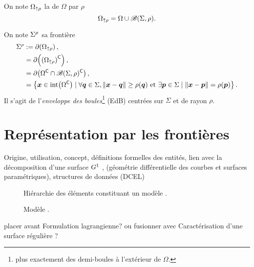 On note ${\Omega}_{\uparrow \rho}$ la  de $\Omega$ par $\rho$
\begin{equation}
    {\Omega}_{\uparrow \rho} = \Omega \cup \mathscr{B}(\Sigma,\rho).
\end{equation}

On note ${\Sigma}^{\rho}$ sa frontière
\begin{align}
    {\Sigma}^{\rho} 
    &:= \partial  \!\left({\Omega}_{\uparrow \rho}\right), \\
    &=  \partial  \!\left(\left({\Omega}_{\uparrow \rho}\right) ^\mathsf{C}\right) , \nonumber\\
    &=  \partial  \!\left(\Omega^\mathsf{C} \cap \mathscr{B}(\Sigma,\rho)^\mathsf{C}\right),\nonumber\\
    &= 
    \left\{
        \boldsymbol{x} \in \mathrm{int}{ \left(\Omega ^\mathsf{C}\right) }
        \mid \forall \boldsymbol{q} \in \Sigma, \left\| {\boldsymbol{x} - \boldsymbol{q}} \right\| \geq \rho(\boldsymbol{q}) 
        \text{ et }
        \exists \boldsymbol{p} \in \Sigma \mid \left\| {\boldsymbol{x} - \boldsymbol{p}} \right\| = \rho(\boldsymbol{p})
    \right\}.
\end{align}
Il s'agit de l'\textit{enveloppe des boules}\footnote{plus exactement des demi-boules à l'extérieur de $\Omega$.} (EdB) centrées sur $\Sigma$ et de rayon $\rho$.

\clearpage
\section{Représentation par les frontières}
Origine, utilisation, concept, définitions formelles des entités, lien avec la décomposition d'une surface $G^{1}$ \piecewise, (géométrie différentielle des courbes et surfaces paramétriques), structures de données (DCEL)

\begin{figure}
	\centering
	
	\caption{Hiérarchie des éléments constituant un modèle \brep.}
	\label{fig:BRep_hierarchy}
\end{figure}

\begin{figure}
	\centering
	
	\caption{Modèle \brep.}
	\label{fig:BRep}
\end{figure}

\par 
placer avant Formulation lagrangienne? ou fusionner avec Caractérisation d'une surface régulière \piecewise?
